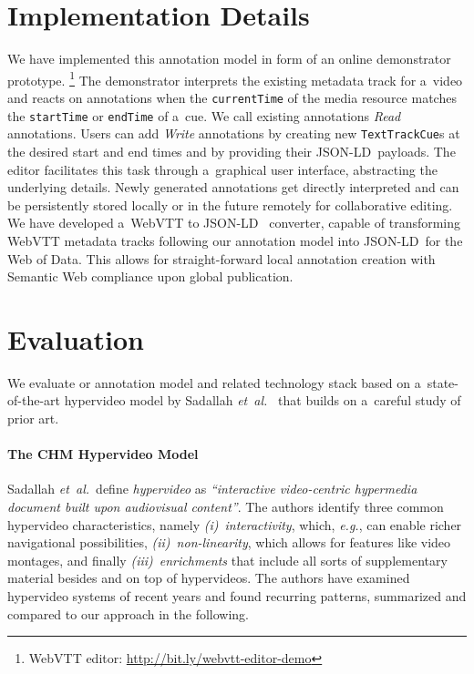 \documentclass{sig-alternate}
\newcommand{\inlinelistingsize}{\fontsize{8pt}{11pt}}
\let\oldurl\url
\renewcommand{\url}[1]{\inlinelistingsize\oldurl{#1}}
\def\JSONLD{\mbox{JSON-LD}}
\begin{document}
\section{Implementation Details}

We have implemented this annotation model
in form of an online demonstrator prototype.%
\footnote{WebVTT editor: \url{http://bit.ly/webvtt-editor-demo}}
The demonstrator interprets the existing metadata track for a~video
and reacts on annotations when the \texttt{currentTime}
of the media resource matches the
\texttt{startTime} or \texttt{endTime} of a~cue.
We call existing annotations \emph{Read} annotations.
Users can add \emph{Write} annotations
by creating new \texttt{TextTrackCue}s
at the desired start and end times
and by providing their \JSONLD~payloads.
The editor facilitates this task through a~graphical user interface, abstracting the underlying details.
Newly generated annotations get directly interpreted
and can be persistently stored locally
or in the future remotely for collaborative editing.
We have developed a~WebVTT to \JSONLD~%
converter, capable of transforming WebVTT metadata tracks
following our annotation model
into \JSONLD~for the Web of Data.
This allows for straight-forward local annotation creation
with Semantic Web compliance upon global publication.

\section{Evaluation}

We evaluate or annotation model and related technology stack
based on a~state-of-the-art hypervideo model by
Sadallah \emph{et~al.}~\cite{sadallah2012hypervideo}
that builds on a~careful study of prior art.

\paragraph{The CHM Hypervideo Model}

Sadallah \emph{et~al.}\ define
\emph{hypervideo} as \textit{``interactive video-centric
hypermedia document built upon audiovisual content''}.
The authors identify three common hypervideo characteristics,\linebreak
namely \emph{(i)}~\emph{interactivity}, which, \emph{e.g.},
can enable richer navigational possibilities,
\emph{(ii)}~\emph{non-linearity}, which allows for features
like video montages, and finally \emph{(iii)}~\emph{enrichments}
that include all sorts of supplementary material besides
and on top of hypervideos.
The authors have examined hypervideo systems
of recent years and found recurring patterns,
summarized and compared to our approach
in the following.\\
\end{document}
